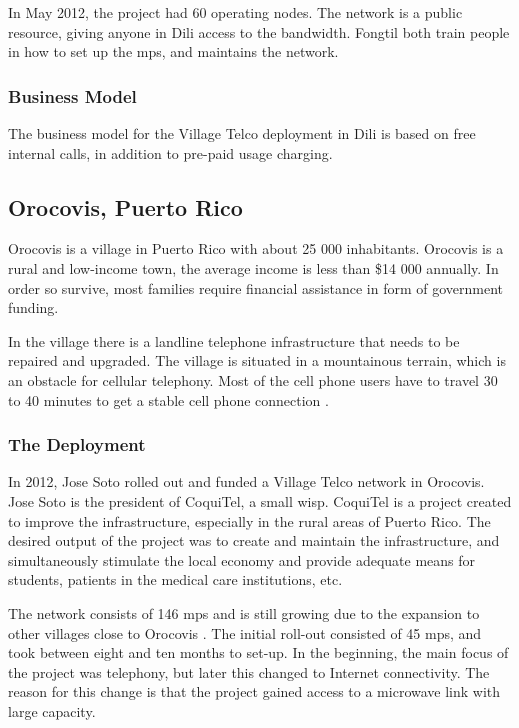 In May 2012, the project had 60 operating nodes. The network is a public resource, giving anyone in Dili access to the bandwidth. Fongtil both train people in how to set up the \glspl{mp}, and maintains the network.


\subsubsection{Business Model}
The business model for the Village Telco deployment in Dili is based on free internal calls, in addition to pre-paid usage charging.  

\subsection{Orocovis, Puerto Rico}
Orocovis is a village in Puerto Rico with about 25 000 inhabitants. Orocovis is a rural and low-income town, the average income is less than \$14 000 annually. In order so survive, most families require financial assistance in form of government funding.   

In the village there is a landline telephone infrastructure that needs to be repaired and upgraded. The village is situated in a mountainous terrain, which is an obstacle for cellular telephony. Most of the cell phone users have to travel 30 to 40 minutes to get a stable cell phone connection \cite{vtpuertorico, soto}. 

\subsubsection{The Deployment}
In 2012, Jose Soto rolled out and funded a Village Telco network in Orocovis. Jose Soto is the president of CoquiTel, a small \gls{wisp}. CoquiTel is a project created to improve the infrastructure, especially in the rural areas of Puerto Rico. The desired output of the project was to create and maintain the infrastructure, and simultaneously stimulate the local economy and provide adequate means for students, patients in the medical care institutions, etc.

The network consists of 146 \glspl{mp} and is still growing due to the expansion to other villages close to Orocovis \cite{vtpuertorico}. The initial roll-out consisted of 45 \glspl{mp}, and took between eight and ten months to set-up. In the beginning, the main focus of the project was telephony, but later this changed to Internet connectivity. The reason for this change is that the project gained access to a microwave link with large capacity. 


